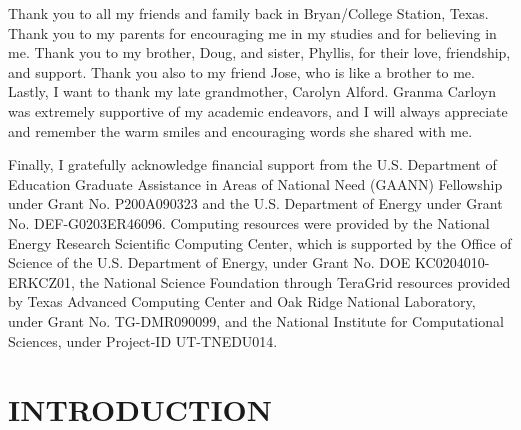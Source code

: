 \documentclass[10pt]{report}  %
\begin{document}
Thank you to all my friends and family back in Bryan/College Station, Texas. Thank you to my parents for encouraging me in my studies and for believing in me. Thank you to my brother, Doug, and sister, Phyllis, for their love, friendship, and support. Thank you also to my friend Jose, who is like a brother to me. Lastly, I want to thank my late grandmother, Carolyn Alford. Granma Carloyn was extremely supportive of my academic endeavors, and I will always appreciate and remember the warm smiles and encouraging words she shared with me.

Finally, I gratefully acknowledge financial support from the U.S. Department of Education Graduate Assistance in Areas of National Need (GAANN) Fellowship under Grant No. P200A090323 and the U.S. Department of Energy under Grant No. DEF-G0203ER46096. Computing resources were provided by the National Energy Research Scientific Computing Center, which is supported by the Office of Science of the U.S. Department of Energy, under Grant No. DOE KC0204010-ERKCZ01, the National Science Foundation through TeraGrid resources provided by Texas Advanced Computing Center and Oak Ridge National Laboratory, under Grant No. TG-DMR090099, and the National Institute for Computational Sciences, under Project-ID UT-TNEDU014.


\singlespacing
\tableofcontents

\begingroup
\setlength{\parskip}{1\baselineskip}
\listoftables
\newpage
\listoffigures
\newpage
\doublespacing
\printnomenclature
\singlespacing
{} 
\newpage
\endgroup

\normalsize
\doublespacing
{}
\setcounter{page}{1}



%
%
%
%
%
\chapter{INTRODUCTION}
\end{document}
